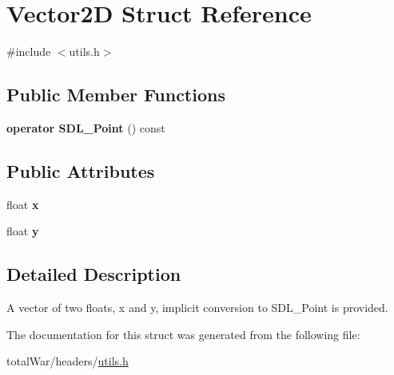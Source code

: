 \hypertarget{struct_vector2_d}{}\section{Vector2D Struct Reference}
\label{struct_vector2_d}


{\ttfamily \#include $<$utils.\+h$>$}

\subsection*{Public Member Functions}
\begin{DoxyCompactItemize}
\item 
\mbox{\label{struct_vector2_d_ac52fb4482d3d2aa45dd2af5565cd57ed}} 
{\bfseries operator S\+D\+L\+\_\+\+Point} () const
\end{DoxyCompactItemize}
\subsection*{Public Attributes}
\begin{DoxyCompactItemize}
\item 
\mbox{\label{struct_vector2_d_aeb4253ba6555251d010ea4450619029e}} 
float {\bfseries x}
\item 
\mbox{\label{struct_vector2_d_a85215519d3f71d0e6be7d636346f3b7d}} 
float {\bfseries y}
\end{DoxyCompactItemize}


\subsection{Detailed Description}
A vector of two floats, x and y, implicit conversion to S\+D\+L\+\_\+\+Point is provided. 

The documentation for this struct was generated from the following file\+:\begin{DoxyCompactItemize}
\item 
total\+War/headers/\hyperlink{utils_8h}{utils.\+h}\end{DoxyCompactItemize}
